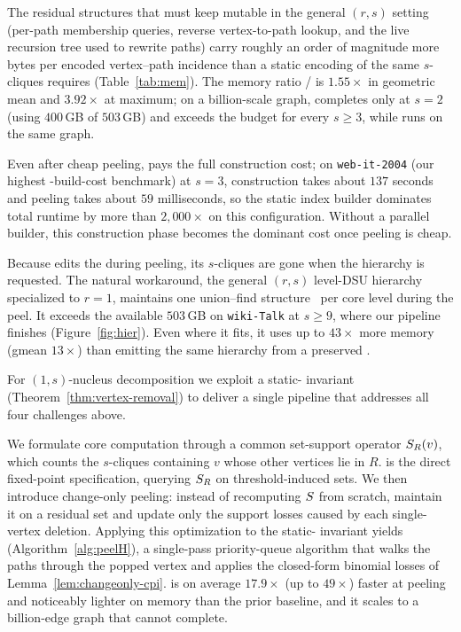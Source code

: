 The residual structures that \cbnd{} must keep mutable in the general $(r,s)$ setting (per-path membership queries, reverse vertex-to-path lookup, and the live recursion tree used to rewrite paths) carry roughly an order of magnitude more bytes per encoded vertex--path incidence than a static encoding of the same $s$-cliques requires (Table~\ref{tab:mem}).
%
The memory ratio \cbnd{}/\spinStar{} is $1.55\times$ in geometric mean and $3.92\times$ at maximum; on a billion-scale graph, \cbnd{} completes only at $s{=}2$ (using $400$\,GB of $503$\,GB) and exceeds the budget for every $s\!\ge\!3$, while \spinStar{} runs on the same graph.

Even after cheap peeling, \cbnd{} pays the full construction cost; on \texttt{web-it-2004} (our highest \cpi{}-build-cost benchmark) at $s{=}3$, construction takes about $137$ seconds and peeling takes about $59$ milliseconds, so the static index builder dominates total runtime by more than $2{,}000\times$ on this configuration.
%
Without a parallel builder, this construction phase becomes the dominant cost once peeling is cheap.

Because \cbnd{} edits the \cpi{} during peeling, its $s$-cliques are gone when the hierarchy is requested.
%
The natural workaround, the general $(r,s)$ level-DSU hierarchy specialized to $r{=}1$, maintains one union--find structure~\cite{TarjanUnionFind} per core level during the peel.
%
It exceeds the available $503$\,GB on \texttt{wiki-Talk} at $s\!\ge\!9$, where our pipeline finishes (Figure~\ref{fig:hier}).
%
Even where it fits, it uses up to $43\times$ more memory (gmean $13\times$) than emitting the same hierarchy from a preserved \cpi{}.

For $(1,s)$-nucleus decomposition we exploit a static-\cpi{} invariant (Theorem~\ref{thm:vertex-removal}) to deliver a single pipeline that addresses all four challenges above.

We formulate core computation through a common set-support operator $S_R(v)$, which counts the $s$-cliques containing $v$ whose other vertices lie in $R$.
%
\spin{} is the direct fixed-point specification, querying $S_R$ on threshold-induced sets.
%
We then introduce change-only peeling: instead of recomputing $S$ from scratch, maintain it on a residual set and update only the support losses caused by each single-vertex deletion.
%
Applying this optimization to the static-\cpi{} invariant yields \spinStar{} (Algorithm~\ref{alg:peelH}), a single-pass priority-queue algorithm that walks the paths through the popped vertex and applies the closed-form binomial losses of Lemma~\ref{lem:changeonly-cpi}.
%
\spinStar{} is on average $17.9\times$ (up to $49\times$) faster at peeling and noticeably lighter on memory than the prior \cbnd{} baseline, and it scales to a billion-edge graph that \cbnd{} cannot complete.

